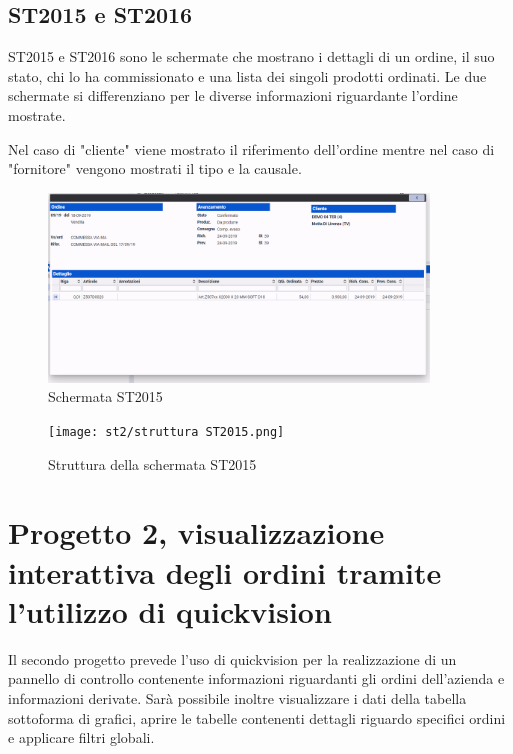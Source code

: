 \documentclass[target=bach,aauheader=,style=]{thud}
\begin{document}
\subsection{ST2015 e ST2016}
ST2015 e ST2016 sono le schermate che mostrano i dettagli di un ordine, il suo stato, chi lo ha commissionato e una lista dei singoli prodotti ordinati.
Le due schermate si differenziano per le diverse informazioni riguardante l'ordine mostrate.

Nel caso di "cliente" viene mostrato il riferimento dell'ordine mentre nel caso di "fornitore" vengono mostrati il tipo e la causale.

\begin{figure}[H]
    \centering
    \includegraphics[width=0.9\textwidth, trim=0cm 0cm 0cm 0cm, clip]{st2/ST2015.png}
    \caption{Schermata ST2015}
\end{figure}

\begin{figure}[H]
    \centering
    \texttt{[image: st2/struttura ST2015.png]}
    \caption{Struttura della schermata ST2015}
\end{figure}


\newpage




\section{Progetto 2, visualizzazione interattiva degli ordini tramite l'utilizzo di quickvision}
Il secondo progetto prevede l'uso di quickvision per la realizzazione di un pannello di controllo contenente informazioni riguardanti gli ordini dell'azienda e informazioni derivate. 
Sarà possibile inoltre visualizzare i dati della tabella sottoforma di grafici, aprire le tabelle contenenti dettagli riguardo specifici ordini e applicare filtri globali.
\end{document}
